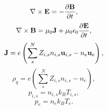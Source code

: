 \documentclass[a4paper,11pt]{report}
\begin{document}
\begin{equation}
    \label{eq:mf_np1fluid_maxwell_1}
    \nabla \times \mathbf{E} = -\frac{ \partial \mathbf{B}}{\partial t},
\end{equation}
\begin{equation}
    \label{eq:mf_np1fluid_maxwell_2}
    \nabla \times \mathbf{B} = \mu_0 \mathbf{J} + \mu_0 \epsilon_0 \frac{\partial \mathbf{E}}{\partial t},
\end{equation}
\begin{equation}
    \label{eq:mf_np1fluid_curr_density}
    \mathbf{J} = e \left(\sum_s^N Z_{i,s} n_{i,s} \mathbf{u}_{i,s} - n_e \mathbf{u}_e \right),
\end{equation}
\begin{equation}
    \label{eq:mf_np1fluid_mass_density}
    \rho_q = e \left( \sum_s^N Z_{i,s} n_{i,s} - n_e \right),
\end{equation}
\begin{equation}
    \label{eq:mf_np1fluid_eos_ion}
    p_{i,s} = n_{i,s} k_B T_{i,s},
\end{equation}
\begin{equation}
    \label{eq:mf_np1fluid_eos_elec}
    p_e = n_e k_B T_e.
\end{equation}

\end{document}
